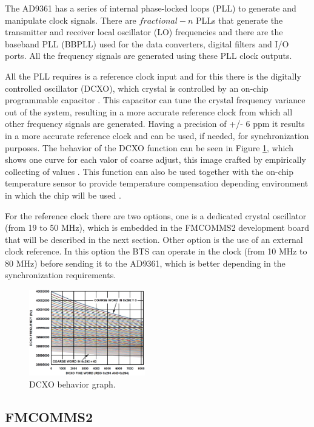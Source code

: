 The AD9361 has a series of internal phase-locked loops (PLL) to generate and
manipulate clock signals. There are $fractional-n$ PLLs that generate the
transmitter and receiver local oscillator (LO) frequencies and there are the
baseband PLL (BBPLL) used for the data converters, digital filters and I/O
ports. All the frequency signals are generated using these PLL clock outputs.

All the PLL requires is a reference clock input and for this there is the
digitally controlled oscillator (DCXO), which crystal is controlled by an
on-chip programmable capacitor \cite{web:ad9361wiki}. This capacitor can tune
the crystal frequency variance out of the system, resulting in a more accurate
reference clock from which all other frequency signals are generated. Having a
precision of +/- 6 ppm it results in a more accurate reference clock and can be
used, if needed, for synchronization purposes. The behavior of the DCXO
function can be seen in Figure \ref{fig:dcxo}, which shows one curve for each
valor of coarse adjust, this image crafted by empirically collecting of values
\cite{ad:ad9361}. This function can also be used together with the on-chip
temperature sensor to provide temperature compensation depending environment in
which the chip will be used \cite{ad:ad9361}.

For the reference clock there are two options, one is a dedicated crystal
oscillator (from 19 to 50 MHz), which is embedded in the FMCOMMS2 development
board that will be described in the next section. Other option is the use of an
external clock reference. In this option the BTS can operate in the clock (from
10 MHz to 80 MHz) before sending it to the AD9361, which is better depending in
the synchronization requirements.

\begin{figure}[htbp]
    \centering
    \includegraphics[width=0.45\textwidth]{./figures/dcxo_graph}
    \caption{ DCXO behavior graph.
    \label{fig:dcxo}}
\end{figure}


\subsection{FMCOMMS2}
\label{trans:fmcomms2}

